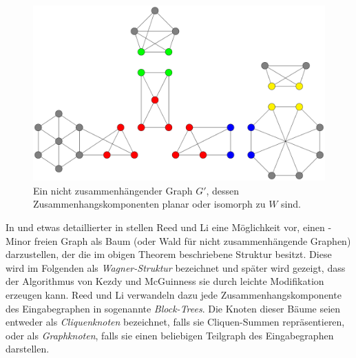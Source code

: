 \begin{figure}[H]
  \centering
  \includegraphics[width=\textwidth,height=\textheight,keepaspectratio]{bilder/WagnerTheorem2.pdf}
  \caption{Ein nicht zusammenhängender Graph $G'$, dessen Zusammenhangskomponenten planar oder isomorph zu $W$ sind.}
  \label{fig:WagnerStruktur2}
\end{figure}

In \cite{ReL08} und etwas detaillierter in \cite{ReL} stellen Reed und Li eine Möglichkeit vor, einen \kf-Minor freien Graph als Baum (oder Wald für nicht zusammenhängende Graphen) darzustellen, der die im obigen Theorem beschriebene Struktur besitzt.
Diese wird im Folgenden als \textit{Wagner-Struktur} bezeichnet und später wird gezeigt, dass der Algorithmus von Kezdy und McGuinness sie durch leichte Modifikation erzeugen kann.
Reed und Li verwandeln dazu jede Zusammenhangskomponente des Eingabegraphen in sogenannte \textit{Block-Trees}.
Die Knoten dieser Bäume seien entweder als \textit{Cliquenknoten} bezeichnet, falls sie Cliquen-Summen repräsentieren, oder als \textit{Graphknoten}, falls sie einen beliebigen Teilgraph des Eingabegraphen darstellen.


